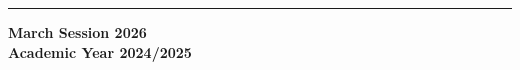 \begin{titlepage}
\begin{otherlanguage}{italian}
\vspace{10mm}

\rule[0.5cm]{15.8cm}{0.6mm}

\begin{center}
{\large{\bf March Session 2026 \\}}
{\large{\bf Academic Year 2024/2025\\}}
\end{center}

\end{otherlanguage}
\endgroup

\end{titlepage}

\clearpage{\pagestyle{empty}\cleardoublepage}
